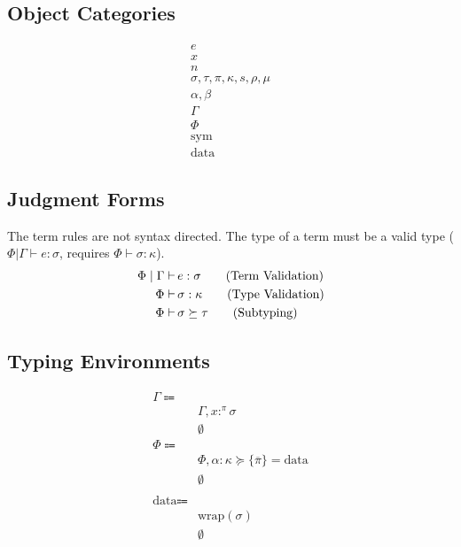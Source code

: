 \documentclass {article}
\begin{document}
\subsection{Object Categories}

\begin{align*}
e \tag{Terms} \\
x \tag{Variables} \\
n \tag{Numbers} \\
\sigma, \tau, \pi, \kappa, s, \rho, \mu \tag{Types} \\
\alpha, \beta \tag{Type Variables} \\
\Gamma \tag{Type Environment} \\
\Phi \tag{Misc Environment} \\
\text{sym} \tag{Symbol} \\
\text{data} \tag{NewType}
\end{align*}


\subsection{Judgment Forms}
The term rules are not syntax directed.
The type of a term must be a valid type ($ \Phi | \Gamma \vdash e : \sigma $, requires $ \Phi \vdash \sigma : \kappa $).
\begin{align*}
\Phi \mid \Gamma \vdash \, & e : \sigma \tag{\text{Term Validation}} \\
\Phi \vdash \, & \sigma : \kappa \tag{\text{Type Validation}} \\
\Phi \vdash \, & \sigma \succeq \tau \tag{Subtyping}
\end{align*}

\subsection{Typing Environments}
\begin{align*}
\Gamma \Coloneqq & \\
& \Gamma, x :^\pi \sigma \\
& \emptyset \\
\Phi \Coloneqq & \\
& \Phi, \alpha : \kappa \succeq \{ \overline \pi \} = \text{data} \\
& \emptyset \\
\\
\text{data} \Coloneqq & \\
& \text{wrap} (\sigma) \\
& \emptyset
\end{align*}
\end{document}
